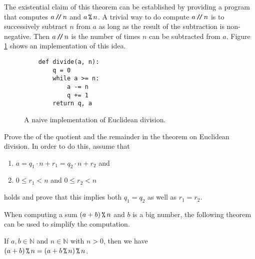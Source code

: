 The existential claim of this theorem can be established by providing a program that computes $a \mbox{\,\texttt{/}$\!$\texttt{/}\,} n$ and $a \,\texttt{\%}\, n$.  
A trivial way to do compute $a \mbox{\,\texttt{/}$\!$\texttt{/}\,} n$ is to successively subtract
$n$ from $a$ as long as the result of the subtraction is non-negative.  Then $a \mbox{\,\texttt{/}$\!$\texttt{/}\,} n$ is the number of times $n$ can be
subtracted from $a$.  Figure \ref{fig:Division-Naive.ipynb} shows an implementation of this idea.

\begin{figure}[!ht]
\centering
\begin{verbatim}
    def divide(a, n):
        q = 0
        while a >= n:
            a -= n
            q += 1
        return q, a
\end{verbatim}
\vspace*{-0.3cm}
\caption{A naive implementation of Euclidean division.}
\label{fig:Division-Naive.ipynb}
\end{figure}
\exercise
Prove the  of the quotient and the remainder in the theorem on Euclidean division.
In order to do this, assume that
\begin{enumerate}
\item $a = q_1 \cdot n + r_1 = q_2 \cdot n + r_2$ and
\item $0 \leq r_1 < n$ and $0 \leq r_2 < n$
\end{enumerate}
holds and prove that this implies both $q_1 = q_2$ as well as $r_1 = r_2$.  \eox

When computing a sum $(a + b) \,\texttt{\%}\, n$ and $b$ is a big number, the following theorem can be used to simplify
the computation.

\begin{Theorem}
  If $a, b \in \mathbb{N}$ and $n \in \mathbb{N}$ with $n > 0$, then we have
  \\[0.2cm]
  \hspace*{1.3cm}
  $\displaystyle (a + b) \,\texttt{\%}\, n = (a + b \,\texttt{\%}\, n) \,\texttt{\%}\, n$.
\end{Theorem}

